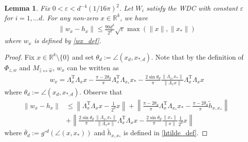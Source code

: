 \documentclass[11pt]{article}
\renewcommand{\epsilon}{\varepsilon}
\newcommand{\R}{\mathbb{R}}
\renewcommand{\top}{{\mathrm{T}}}
\newtheorem{lem}{Lemma}
\theoremstyle{remark}
\begin{document}
\begin{lem} \label{conc_wx_to_hx}
Fix $0 < \epsilon < d^{-4}(1/16\pi)^2$. Let $W_i$ satisfy the WDC with constant $\epsilon$ for $i = 1,\dots d$. For any non-zero $x \in \R^k$, we have \begin{align*}
\|w_{x} - h_{x}\| \leqslant \frac{90d^3}{2^d}\sqrt{\epsilon}\max(\|x\|,\|x_*\|)
\end{align*} where $w_x$ is defined by \eqref{wx_def}.
\end{lem}
\begin{proof} Fix $x \in \R^k\setminus\{0\}$ and set $\theta_d := \angle(x_d,x_{*,d})$. Note that by the definition of $\Phi_{z,w}$ and $M_{\hat{z}\leftrightarrow \hat{w}}$, $w_x$ can be written as \begin{align*}
    w_x
    = \Lambda_x^{\top}\Lambda_x x - \frac{\pi-2\theta_d}{\pi}\Lambda_x^{\top}\Lambda_{x_*}x_* - \frac{2\sin\theta_d}{\pi}\frac{\|\Lambda_{x_*} x_*\|}{\|\Lambda_x x\|}\Lambda_x^{\top}\Lambda_x x
\end{align*} where $\theta_d := \angle (x_d,x_{*,d}).$ Observe that \begin{align*}
\|w_x- h_{x}\| & \leqslant \left\|\Lambda_x^\top\Lambda_x x - \frac{1}{2^d}x\right\| + \left\|\frac{\pi - 2\theta_d}{\pi}\Lambda_x^\top\Lambda_{x_*}x_* - \frac{\pi - 2\overline{\theta}_d}{\pi}\tilde{h}_{x,x_*}\right\|\ \\
& + \left\|\frac{2\sin \theta_d}{\pi}\frac{\|\Lambda_{x_*}x_*\|}{\|\Lambda_x x\|}\Lambda_x^\top\Lambda_x x - \frac{2\sin \overline{\theta}_d}{\pi} \frac{\|x_*\|}{\|x\|}\frac{1}{2^d}x\right\|
\end{align*} where $\overline{\theta}_d:=g^{\circ d}(\angle(x,x_*))$ and $\tilde{h}_{x,x_*}$ is defined in \eqref{htilde_def}.


\end{proof}
\end{document}
